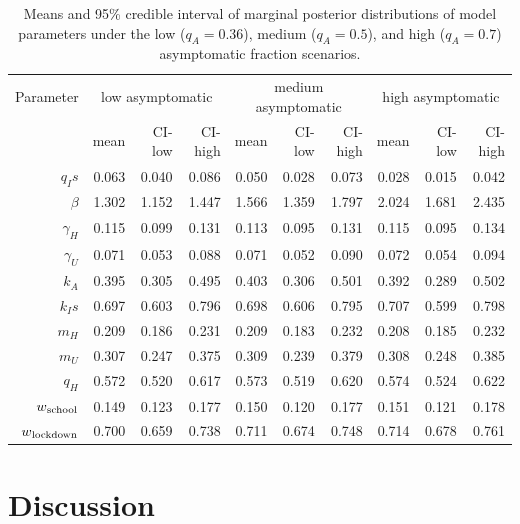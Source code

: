 \documentclass[11pt]{article}
\begin{document}
\begin{spacing}{1.25}
\begin{table}
	\centering
	\caption{Means and 95\% credible interval of marginal posterior distributions of model parameters under the low ($q_A = 0.36$), medium ($q_A = 0.5$), and high ($q_A = 0.7$) asymptomatic fraction scenarios.}
	\begin{tabular}{rrrrrrrrrr}
		\hline
		Parameter & \multicolumn{3}{c}{low asymptomatic} & \multicolumn{3}{c}{medium asymptomatic} & \multicolumn{3}{c}{high asymptomatic} \\
		{} & mean & CI-low & CI-high & mean & CI-low & CI-high & mean & CI-low & CI-high \\ 
		\hline
	$q_Is$ & 0.063 & 0.040 & 0.086 & 0.050 & 0.028 & 0.073 & 0.028 & 0.015 & 0.042 \\ 
	$\beta$ & 1.302 & 1.152 & 1.447 & 1.566 & 1.359 & 1.797 & 2.024 & 1.681 & 2.435 \\ 
	$\gamma_H$ & 0.115 & 0.099 & 0.131 & 0.113 & 0.095 & 0.131 & 0.115 & 0.095 & 0.134 \\ 
	$\gamma_U$ & 0.071 & 0.053 & 0.088 & 0.071 & 0.052 & 0.090 & 0.072 & 0.054 & 0.094 \\ 
	$k_A$ & 0.395 & 0.305 & 0.495 & 0.403 & 0.306 & 0.501 & 0.392 & 0.289 & 0.502 \\ 
	$k_Is$ & 0.697 & 0.603 & 0.796 & 0.698 & 0.606 & 0.795 & 0.707 & 0.599 & 0.798 \\ 
	$m_H$ & 0.209 & 0.186 & 0.231 & 0.209 & 0.183 & 0.232 & 0.208 & 0.185 & 0.232 \\ 
	$m_U$ & 0.307 & 0.247 & 0.375 & 0.309 & 0.239 & 0.379 & 0.308 & 0.248 & 0.385 \\ 
	$q_H$ & 0.572 & 0.520 & 0.617 & 0.573 & 0.519 & 0.620 & 0.574 & 0.524 & 0.622 \\ 
	$w\textsubscript{school}$ & 0.149 & 0.123 & 0.177 & 0.150 & 0.120 & 0.177 & 0.151 & 0.121 & 0.178 \\ 
	$w\textsubscript{lockdown}$ & 0.700 & 0.659 & 0.738 & 0.711 & 0.674 & 0.748 & 0.714 & 0.678 & 0.761 \\ 
		\hline
	\end{tabular}
\label{tbl:posterior}
\end{table}
\end{spacing}



\section{Discussion}
\end{document}
